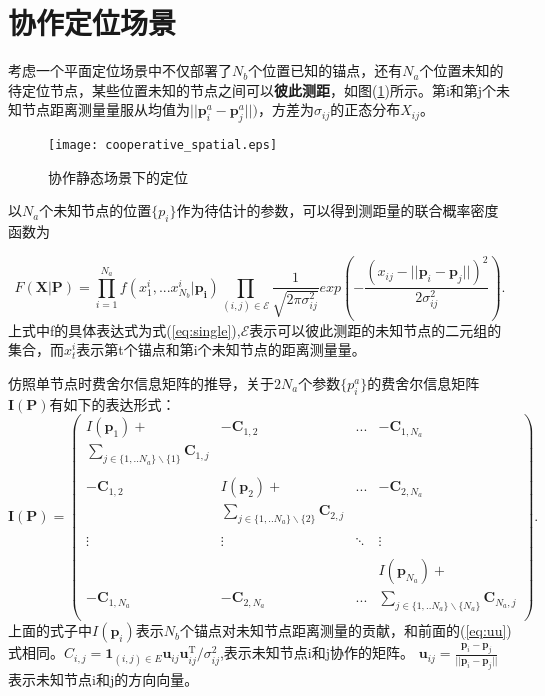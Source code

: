 \section[协作定位场景]{协作定位场景}\label{section:cooperative_localization}

考虑一个平面定位场景中不仅部署了$N_b$个位置已知的锚点，还有$N_a$个位置未知的待定位节点，某些位置未知的节点之间可以\textbf{彼此测距}，如图(\ref{fig:cooperative_spatial})所示。第i和第j个未知节点距离测量量服从均值为$||\bm{p}^a_i-\bm{p}^a_j||)$，方差为$\sigma_{ij}$的正态分布$X_{ij}$。
        \begin{figure}
          \centering
          \texttt{[image: cooperative\_spatial.eps]}
          \caption{协作静态场景下的定位}\label{fig:cooperative_spatial}
        \end{figure}

以$N_a$个未知节点的位置$\{p_i\}$作为待估计的参数，可以得到测距量的联合概率密度函数为

\begin{equation}
F(\bm{X}|\bm{P})=\prod_{i=1}^{N_a} f(x^i_1,...x^{i}_{N_b}|\bm{p_i})\prod_{(i,j)\in \mathcal{E}}\frac{1}{\sqrt{2\pi\sigma_{ij}^2}}exp\left(-\frac{(x_{ij}-||\bm{p}_i-\bm{p}_j||)^2}{2\sigma_{ij}^2}\right).
\end{equation}
上式中f的具体表达式为式(\ref{eq:single}),$\mathcal{E}$表示可以彼此测距的未知节点的二元组的集合，而$x_t^i$表示第t个锚点和第i个未知节点的距离测量量。


仿照单节点时费舍尔信息矩阵的推导，关于$2N_a$个参数$\{p_i^a\}$的费舍尔信息矩阵$\bm{I}(\bm{P})$有如下的表达形式：
\begin{equation}\label{eq:general_fim}
\bm{I}(\bm{P})=
\left(
\begin{array}{cccc}
I(\bm{p}_1)+&-\bm{C}_{1,2}&...&-\bm{C}_{1,N_a}\\
\sum_{j\in \{1,..N_a\}\backslash\{1\}}\bm{C}_{1,j}&&&\\
&&&\\
-\bm{C}_{1,2} & I(\bm{p}_2)+
&...&-\bm{C}_{2,N_a}\\
&\sum_{j\in \{1,..N_a\}\backslash \{2\}}\bm{C}_{2,j}&&\\
&&&\\
\vdots &\vdots&\ddots &\vdots\\
&&&\\
&&&I(\bm{p}_{N_a})+\\
-\bm{C}_{1,N_a}&-\bm{C}_{2,N_a}&...& \sum_{j\in \{1,..N_a\}\backslash\{N_a\}}\bm{C}_{N_a,j}\\
\end{array}
\right).
\end{equation}
上面的式子中$I(\bm{p}_i)$表示$N_b$个锚点对未知节点距离测量的贡献，和前面的(\ref{eq:uu})式相同。$C_{i,j}=\bm{1}_{(i,j)\in E}\bm{u}_{ij}\bm{u}_{ij}^{\textrm{T}} /\sigma^2_{ij}$,表示未知节点i和j协作的矩阵。
$\bm{u}_{ij}=\frac{\bm{p}_i-\bm{p}_j}{||\bm{p}_i-\bm{p}_j||}$表示未知节点i和j的方向向量。
